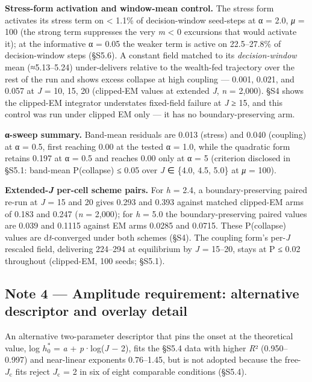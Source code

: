 \documentclass[11pt,letterpaper]{article}
\begin{document}
\textbf{Stress-form activation and window-mean control.} The stress form activates its stress term on \textless{} 1.1\% of decision-window seed-steps at α = 2.0, \emph{μ} = 100 (the strong term suppresses the very \emph{m} \textless{} 0 excursions that would activate it); at the informative α = 0.05 the weaker term is active on 22.5--27.8\% of decision-window steps (§S5.6). A constant field matched to its \emph{decision-window} mean (≈5.13--5.24) under-delivers relative to the wealth-fed trajectory over the rest of the run and shows excess collapse at high coupling --- 0.001, 0.021, and 0.057 at \emph{J} = 10, 15, 20 (clipped-EM values at extended \emph{J}, \emph{n} = 2,000). §S4 shows the clipped-EM integrator understates fixed-field failure at \emph{J} ≥ 15, and this control was run under clipped EM only --- it has no boundary-preserving arm.

\textbf{α-sweep summary.} Band-mean residuals are 0.013 (stress) and 0.040 (coupling) at α = 0.5, first reaching 0.00 at the tested α = 1.0, while the quadratic form retains 0.197 at α = 0.5 and reaches 0.00 only at α = 5 (criterion disclosed in §S5.1: band-mean P(collapse) ≤ 0.05 over \emph{J} ∈ \{4.0, 4.5, 5.0\} at \emph{μ} = 100).

\textbf{Extended-\emph{J} per-cell scheme pairs.} For \emph{h} = 2.4, a boundary-preserving paired re-run at \emph{J} = 15 and 20 gives 0.293 and 0.393 against matched clipped-EM arms of 0.183 and 0.247 (\emph{n} = 2,000); for \emph{h} = 5.0 the boundary-preserving paired values are 0.039 and 0.1115 against EM arms 0.0285 and 0.0715. These P(collapse) values are d\emph{t}-converged under both schemes (§S4). The coupling form's per-\emph{J} rescaled field, delivering 224--294 at equilibrium by \emph{J} = 15--20, stays at P ≤ 0.02 throughout (clipped-EM, 100 seeds; §S5.1).

\subsection{Note 4 --- Amplitude requirement: alternative descriptor and overlay detail}\label{note-4-amplitude-requirement-alternative-descriptor-and-overlay-detail}

An alternative two-parameter descriptor that pins the onset at the theoretical value, log \(h_0^*\) = \emph{a} + \emph{p}·log(\emph{J} − 2), fits the §S5.4 data with higher \emph{R}² (0.950--0.997) and near-linear exponents 0.76--1.45, but is not adopted because the free-\(J_{\mathrm{c}}\) fits reject \(J_{\mathrm{c}}\) = 2 in six of eight comparable conditions (§S5.4).
\end{document}
